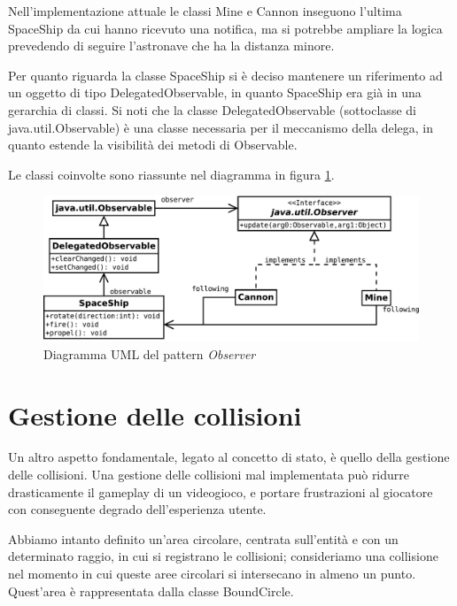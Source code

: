 \documentclass[a4paper,12pt]{article}
\begin{document}
Nell'implementazione attuale le classi \textsf{Mine} e \textsf{Cannon} inseguono l'ultima \textsf{SpaceShip} da cui hanno ricevuto una notifica, ma si potrebbe ampliare la logica prevedendo di seguire l'astronave che ha la distanza minore.

Per quanto riguarda la classe \textsf{SpaceShip} si \`e deciso mantenere un riferimento ad un oggetto di tipo \textsf{DelegatedObservable}, in quanto \textsf{SpaceShip} era gi\`a in una gerarchia di classi. Si noti che la classe \textsf{DelegatedObservable} (sottoclasse di \textsf{java.util.Observable}) \`e una classe necessaria per il meccanismo della delega, in quanto estende la visibilit\`a dei metodi di \textsf{Observable}.

Le classi coinvolte sono riassunte nel diagramma in figura \ref{img:Observer}.

\begin{figure}[ht]
\centering
\includegraphics[width=14cm]{Observer.pdf}
\caption{Diagramma UML del pattern \emph{Observer}}
\label{img:Observer}
\end{figure}

\section{Gestione delle collisioni}
\label{sec:collisioni}

Un altro aspetto fondamentale, legato al concetto di stato, \`e quello della gestione delle collisioni. Una gestione delle collisioni mal implementata pu\`o ridurre drasticamente il gameplay di un videogioco, e portare frustrazioni al giocatore con conseguente degrado dell'esperienza utente.

Abbiamo intanto definito un'area circolare, centrata sull'entit\`a e con un determinato raggio, in cui si registrano le collisioni; consideriamo una collisione nel momento in cui queste aree circolari si intersecano in almeno un punto. Quest'area \`e rappresentata dalla classe \textsf{BoundCircle}.
\end{document}
